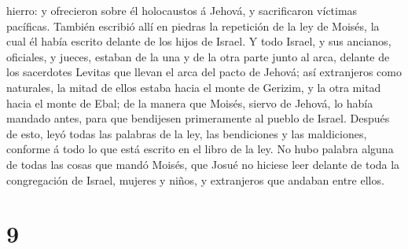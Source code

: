 hierro: y ofrecieron sobre él holocaustos á Jehová, y sacrificaron
víctimas pacíficas.  También escribió allí en piedras la
repetición de la ley de Moisés, la cual él había escrito delante de los
hijos de Israel.  Y todo Israel, y sus ancianos,
oficiales, y jueces, estaban de la una y de la otra parte junto al arca,
delante de los sacerdotes Levitas que llevan el arca del pacto de
Jehová; así extranjeros como naturales, la mitad de ellos estaba hacia
el monte de Gerizim, y la otra mitad hacia el monte de Ebal; de la
manera que Moisés, siervo de Jehová, lo había mandado antes, para que
bendijesen primeramente al pueblo de Israel.  Después de
esto, leyó todas las palabras de la ley, las bendiciones y las
maldiciones, conforme á todo lo que está escrito en el libro de la ley.
 No hubo palabra alguna de todas las cosas que mandó
Moisés, que Josué no hiciese leer delante de toda la congregación de
Israel, mujeres y niños, y extranjeros que andaban entre ellos.

\hypertarget{section-8}{%
\section{9}\label{section-8}}

